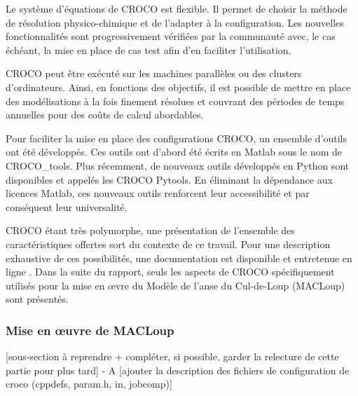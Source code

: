 \documentclass[10pt,a4paper,titlepage]{article}
\begin{document}
    Le système d'équations de CROCO est flexible.
    Il permet de choisir la méthode de résolution physico-chimique et de l'adapter à la configuration.
    Les nouvelles fonctionnalités sont progressivement vérifiées par la communauté avec, le cas échéant, la mise en place de cas test afin d'en faciliter l'utilisation.
    
    
    CROCO peut être exécuté sur les machines parallèles ou des clusters d'ordinateurs.
    Ainsi, en fonctions des objectifs, il est possible de mettre en place des modélisations à la fois finement résolues et couvrant des périodes de temps annuelles pour des coûts de calcul abordables.
    
    Pour faciliter la mise en place des configurations CROCO, un ensemble d'outils ont été développés.
    Ces outils ont d'abord été écrits en Matlab sous le nom de CROCO\_tools.
    Plus récemment, de nouveaux outils développés en Python sont disponibles et appelés les CROCO Pytools.
    En éliminant la dépendance aux licences Matlab, ces nouveaux outils renforcent leur accessibilité et par conséquent leur universalité.
    
    CROCO étant très polymorphe, une présentation de l'ensemble des caractéristiques offertes sort du contexte de ce travail.
    Pour une description exhaustive de ces possibilités, une documentation est disponible et entretenue en ligne \cite{documentation_croco}.
    Dans la suite du rapport, seuls les aspects de CROCO spécifiquement utilisés pour la mise en \oe{}vre du Modèle de l'anse du Cul-de-Loup (MACLoup) sont présentés.
    
    
    \subsubsection{Mise en \oe{}uvre de MACLoup}
    \label{subsub:presentation_generale}
    \alert{[sous-section à reprendre + compléter, si possible, garder la relecture de cette partie pour plus tard] - A
        [ajouter la description des fichiers de configuration de croco (cppdefs, param.h, in, jobcomp)]}
    
\end{document}
